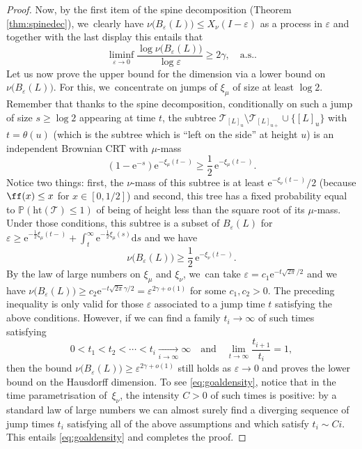 \documentclass[JEP,XML,SOM,Unicode,NoFloatCountersInSection, NoEqCountersInSection,published]{cedram}
\let\dH\gamma
\newcommand{\T}{\mathcal{T}}\let\CRT\T\let\tbr\T
\newcommand{\h}{\mathrm{ht}}
\theoremstyle{definition}
\begin{document}
\begin{proof}
Now, by the first item of the spine decomposition (Theorem \ref{thm:spinedec}), we~clearly have $\nu\big(B_{ \varepsilon }(L)\big) \leq X_\nu(I - \varepsilon)$ as a process in $ \varepsilon$ and together with the last display this entails that
\[
\liminf_{ \varepsilon \to 0} \frac{\log \nu \big(B_\varepsilon(L)\big) }{\log \varepsilon} \geq 2 \dH, \quad \text{a.s.}.
\]
Let us now prove the upper bound for the dimension via a lower bound on $\nu \big(B_\varepsilon(L)\big)$. For this, we~concentrate on jumps of $\xi_\mu$ of size at least $\log 2$. Remember that thanks to the spine decomposition, conditionally on such a jump of size $s\geq \log 2$ appearing at time $t$, the subtree $\T_{[L]_{u}}\setminus \T_{[L]_{u+}} \cup \{[L]_{u}\}$ with $t=\theta(u)$ (which is the subtree which is ``left on the side'' at height $u$) is an independent Brownian CRT with $\mu$-mass
\[
(1- \mathrm{e}^{-s}) \mathrm{e}^{- \xi_\mu(t-)} \geq \frac{1}{2}\, \mathrm{e}^{- \xi_\mu(t-)}.
\]
Notice two things: first, the $\nu$-mass of this subtree is at least $ \mathrm{e}^{- \xi_\nu(t-)}/2$ (because $\ff(x) \leq x$ for $x \in [0,1/2]$) and second, this tree has a fixed probability equal to $ \mathbb{P}(\h(\mathcal{T}) \leq 1)$ of being of height less than the square root of its $\mu$-mass. Under those conditions, this subtree is a subset of $B_{ \varepsilon}(L)$ for $\varepsilon \geq \mathrm{e}^{-\frac12 \xi_\mu(t-)} + \int_{t}^\infty \mathrm{e}^{-\frac12 \xi_\mu(s)} \mathrm{d}s$ and we have
\begin{equation} \label{eq:lowerbound12}\nu \big(B_{ \varepsilon}(L)\big) \geq \frac12\, \mathrm{e}^{- \xi_\nu(t-)}.
\end{equation} By the law of large numbers on $\xi_\mu$ and $\xi_\nu$, we~can take $\varepsilon = c_1 \mathrm{e}^{- t \sqrt{2\pi}/2}$ and we have $\nu \big(B_{ \varepsilon}(L)\big) \geq c_2 \mathrm{e}^{- t \sqrt{2\pi} \gamma/2} = \varepsilon^{2\gamma + o(1)}$ for some $c_1,c_2>0$. The preceding inequality is only valid for those $ \varepsilon$ associated to a jump time $t$ satisfying the above conditions. However, if we can find a family $t_i \to \infty$ of such times satisfying
\begin{equation} \label{eq:goaldensity} 0 < t_1 < t_2 < \cdots < t_i \xrightarrow[\textstyle i \to \infty]{} \infty \quad \text{and} \quad\lim_{t \to \infty} \frac{t_{i+1}}{t_i} =1,
\end{equation}
then the bound $\nu \big(B_{ \varepsilon}(L)\big) \geq \varepsilon^{2\gamma + o(1)}$ still holds as $ \varepsilon \to 0$ and proves the lower bound on the Hausdorff dimension. To see \eqref{eq:goaldensity}, notice that in the time parametrisation of~$\xi_\nu$, the intensity $C>0$ of such times is positive: by a standard law of large numbers we can almost surely find a diverging sequence of jump times $t_i$ satisfying all of the above assumptions and which satisfy $t_i \sim C i$. This entails \eqref{eq:goaldensity} and completes the proof.
\end{proof}
\end{document}
